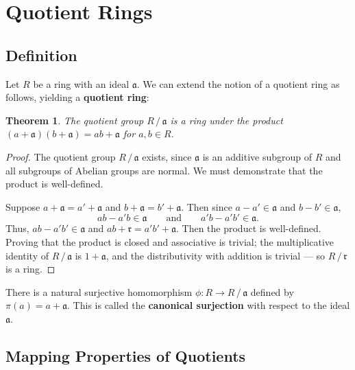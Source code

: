 \documentclass[11pt]{article}
\newtheorem{theorem}{Theorem}
\begin{document}

\section{Quotient Rings}


\subsection{Definition}

Let $R$ be a ring with an ideal $\mathfrak{a}$. We can extend the notion of a quotient ring as follows, yielding a \textbf{quotient ring}:

\begin{adjustwidth}{0.5cm}{}
	\begin{theorem}
		The quotient group $R \,/\, \mathfrak{a}$ is a ring under the product $(a + \mathfrak{a})(b + \mathfrak{a}) = ab + \mathfrak{a}$ for $a, b \in R$.
	\end{theorem}
	\begin{proof}
		The quotient group $R \,/\, \mathfrak{a}$ exists, since $\mathfrak{a}$ is an additive subgroup of $R$ and all subgroups of Abelian groups are normal. We must demonstrate that the product is well-defined.
		
		Suppose $a + \mathfrak{a} = a' + \mathfrak{a}$ and $b + \mathfrak{a} = b' + \mathfrak{a}$. Then since $a - a' \in \mathfrak{a}$ and $b - b' \in \mathfrak{a}$,
		\[
			ab - a'b \in \mathfrak{a} \qquad \text{and} \qquad a'b - a'b' \in \mathfrak{a}.
		\]
		Thus, $ab - a'b' \in \mathfrak{a}$ and $ab + \mathfrak{r} = a'b' + \mathfrak{a}$. Then the product is well-defined. Proving that the product is closed and associative is trivial; the multiplicative identity of $R \,/\, \mathfrak{a}$ is $1 + \mathfrak{a}$, and the distributivity with addition is trivial --- so $R \,/\, \mathfrak{r}$ is a ring.
	\end{proof}
\end{adjustwidth}

There is a natural surjective homomorphism $\phi : R \to R \,/\, \mathfrak{a}$ defined by $\pi(a) = a + \mathfrak{a}$. This is called the \textbf{canonical surjection} with respect to the ideal $\mathfrak{a}$.

\newpage


\subsection{Mapping Properties of Quotients}
\end{document}
